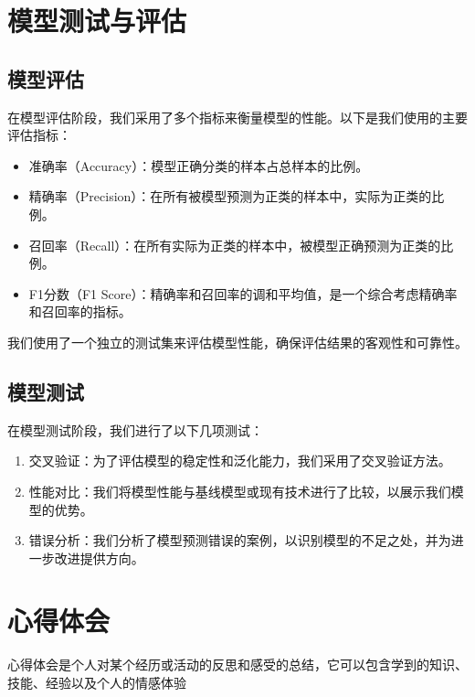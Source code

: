 \documentclass{xdutlabreport}
\begin{document}
\newpage
\section{模型测试与评估}
\subsection{模型评估}
在模型评估阶段，我们采用了多个指标来衡量模型的性能。以下是我们使用的主要评估指标：

\begin{itemize}
    \item 准确率（Accuracy）：模型正确分类的样本占总样本的比例。
    \item 精确率（Precision）：在所有被模型预测为正类的样本中，实际为正类的比例。
    \item 召回率（Recall）：在所有实际为正类的样本中，被模型正确预测为正类的比例。
    \item F1分数（F1 Score）：精确率和召回率的调和平均值，是一个综合考虑精确率和召回率的指标。
\end{itemize}

我们使用了一个独立的测试集来评估模型性能，确保评估结果的客观性和可靠性。

\subsection{模型测试}
在模型测试阶段，我们进行了以下几项测试：

\begin{enumerate}
    \item 交叉验证：为了评估模型的稳定性和泛化能力，我们采用了交叉验证方法。
    \item 性能对比：我们将模型性能与基线模型或现有技术进行了比较，以展示我们模型的优势。
    \item 错误分析：我们分析了模型预测错误的案例，以识别模型的不足之处，并为进一步改进提供方向。
\end{enumerate}

\newpage
\section{心得体会}
心得体会是个人对某个经历或活动的反思和感受的总结，它可以包含学到的知识、技能、经验以及个人的情感体验
\end{document}
